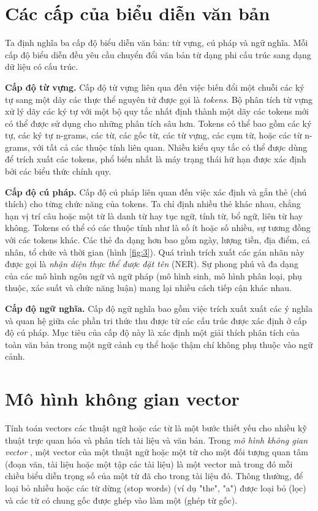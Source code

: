 \documentclass[14pt, a4paper]{article}
\numberwithin{equation}{section}
\numberwithin{figure}{section}
\numberwithin{dl}{section}
\numberwithin{md}{section}
\numberwithin{bd}{section}
\numberwithin{dn}{section}
\numberwithin{hq}{section}
\begin{document}
    \section{Các cấp của biểu diễn văn bản}

    Ta định nghĩa ba cấp độ biểu diễn văn bản: từ vựng, cú pháp và ngữ nghĩa.
    Mỗi cấp độ biểu diễn đều yêu cầu chuyển đổi văn bản từ dạng phi cấu trúc sang dạng dữ liệu có cấu trúc.

    \textbf{Cấp độ từ vựng.} Cấp độ từ vựng liên qua đến việc biến đổi một chuỗi các ký tự sang một dãy các thực thể nguyên tử được gọi là \textit{tokens}.
    Bộ phân tích từ vựng xử lý dãy các ký tự với một bộ quy tắc nhất định thành một dãy các tokens mới có thể được sử dụng cho những phân tích sâu hơn.
    Tokens có thể bao gồm các ký tự, các ký tự n-grams, các từ, các gốc từ, các từ vựng, các cụm từ, hoặc các từ n-grams, với tất cả các thuộc tính liên quan.
    Nhiều kiểu quy tắc có thể được dùng để trích xuất các tokens, phổ biến nhất là máy trạng thái hữ hạn được xác định bởi các biểu thức chính quy.

    \textbf{Cấp độ cú pháp.} Cấp độ cú pháp liên quan đến việc xác định và gắn thẻ (chú thích) cho từng chức năng của tokens.
    Ta chỉ định nhiều thẻ khác nhau, chẳng hạn vị trí câu hoặc một từ là danh từ hay tục ngữ, tính từ, bổ ngữ, liên từ hay không.
    Tokens có thể có các thuộc tính như là số ít hoặc số nhiều, sự tương đồng với các tokens khác.
    Các thẻ đa dạng hơn bao gồm ngày, lượng tiền, địa điểm, cá nhân, tổ chức và thời gian (hình \ref{fig:3}).
    Quá trình trích xuất các gán nhãn này được gọi là \textit{nhận diện thực thể được đặt tên} (NER).
    Sự phong phú và đa dạng của các mô hình ngôn ngữ và ngữ pháp (mô hình sinh, mô hình phân loại, phụ thuộc, xác suất và chức năng luận) mang lại nhiều cách tiếp cận khác nhau.

    \textbf{Cấp độ ngữ nghĩa.} Cấp độ ngữ nghĩa bao gồm việc trích xuất xuất các ý nghĩa và quan hệ giữa các phần tri thức thu được từ các cấu trúc được xác định ở cấp độ cú pháp.
    Mục tiêu của cấp độ này là xác định một giải thích phân tích của toàn văn bản trong một ngữ cảnh cụ thể hoặc thậm chí không phụ thuộc vào ngữ cảnh.

    \section{Mô hình không gian vector}

    Tính toán vectors các thuật ngữ hoặc các từ là một bước thiết yếu cho nhiều kỹ thuật trực quan hóa và phân tích tài liệu và văn bản.
    Trong \textit{mô hình không gian vector} \cite{356}, một vector của một thuật ngữ hoặc một từ cho một đối tượng quan tâm (đoạn văn, tài liệu hoặc một tập các tài liệu) là một vector mà trong đó mỗi chiều biểu diễn trọng số của một từ đã cho trong tài liệu đó.
    Thông thường, để loại bỏ nhiễu hoặc các từ dừng (stop words) (ví dụ "the", "a") được loại bỏ (lọc) và các từ có chung gốc được ghép vào làm một (ghép từ gốc).
\end{document}
